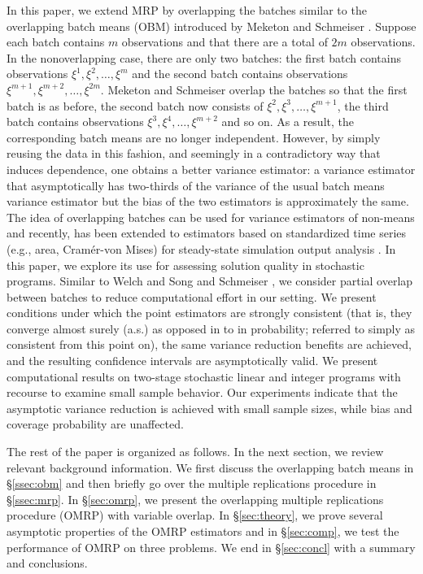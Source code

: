 \documentclass[11pt]{article}
\newcommand{\xit}{\xi}  %
\begin{document}
In this paper, we extend MRP by overlapping the batches similar to the overlapping batch means (OBM) introduced by Meketon and Schmeiser \cite{Meketon1984}. 
Suppose each batch contains $m$ observations and that there are a total of $2m$ observations.  
In the nonoverlapping case, there are only two batches: the first batch contains observations $\xit^1, \xit^2, \dots, \xit^m$ and the second batch contains observations $\xit^{m+1}, \xit^{m+2}, \dots, \xit^{2m}$.   
Meketon and Schmeiser \cite{Meketon1984} overlap the batches so that the first batch is as before, the second batch now consists of $\xit^2, \xit^3, \dots, \xit^{m+1}$, the third batch contains observations $\xit^3, \xit^4, \dots, \xit^{m+2}$ and so on. 
As a result, the corresponding batch means are no longer independent. 
However, by simply reusing the data in this fashion, and seemingly in a contradictory way that induces dependence, one obtains a better variance estimator: a variance estimator that asymptotically has two-thirds of the variance of the usual batch means variance estimator but the bias of the two estimators is approximately the same.  
The idea of overlapping batches can be used for variance estimators of non-means \cite{SAH90} and recently, has been extended to estimators based on standardized time series (e.g., area, Cram\'{e}r-von Mises) for steady-state simulation output analysis \cite{Alexopoulos01012007,Alexopoulos2007}. 
In this paper, we explore its use for assessing solution quality in stochastic programs.  
Similar to Welch \cite{Welch1987} and Song and Schmeiser \cite{Song1992}, we consider partial overlap between batches to reduce computational effort in our setting. 
We present conditions under which the point estimators are strongly consistent (that is, they converge almost surely (a.s.) as opposed in to in probability; referred to simply as consistent from this point on), the same variance reduction benefits are achieved, and the resulting confidence intervals are asymptotically valid.  
We present computational results on two-stage stochastic linear and integer programs with recourse to examine small sample behavior.  
Our experiments indicate that the asymptotic variance reduction is achieved with small sample sizes, while bias and coverage probability are unaffected.

The rest of the paper is organized as follows.  
In the next section, we review relevant background information.  
We first discuss the overlapping batch means in \S \ref{ssec:obm} and then briefly go over the multiple replications procedure in \S \ref{ssec:mrp}.  
In \S \ref{sec:omrp}, we present the overlapping multiple replications procedure (OMRP) with variable overlap.  
In \S \ref{sec:theory}, we prove several asymptotic properties of the OMRP estimators and in \S \ref{sec:comp}, we test the performance of OMRP on three problems.  
We end in \S \ref{sec:concl} with a summary and conclusions.
\end{document}
